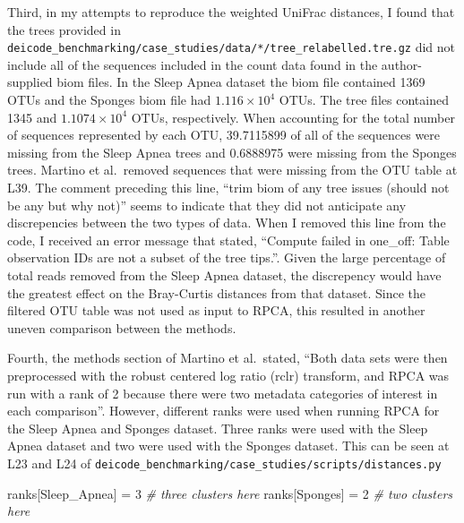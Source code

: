 \documentclass[
]{article}
\newenvironment{Shaded}{}{}
\newcommand{\CommentTok}[1]{\textcolor[rgb]{0.63,0.63,0.65}{\textit{#1}}}
\newcommand{\DecValTok}[1]{\textcolor[rgb]{0.60,0.41,0.00}{#1}}
\newcommand{\NormalTok}[1]{\textcolor[rgb]{0.22,0.23,0.26}{#1}}
\newcommand{\OperatorTok}[1]{\textcolor[rgb]{0.65,0.15,0.64}{#1}}
\newcommand{\StringTok}[1]{\textcolor[rgb]{0.31,0.63,0.31}{#1}}
\begin{document}
Third, in my attempts to reproduce the weighted UniFrac distances, I
found that the trees provided in
\texttt{deicode\_benchmarking/case\_studies/data/*/tree\_relabelled.tre.gz}
did not include all of the sequences included in the count data found in
the author-supplied biom files. In the Sleep Apnea dataset the biom file
contained 1369 OTUs and the Sponges biom file had
\ensuremath{1.116\times 10^{4}} OTUs. The tree files contained 1345 and
\ensuremath{1.1074\times 10^{4}} OTUs, respectively. When accounting for
the total number of sequences represented by each OTU, 39.7115899 of all
of the sequences were missing from the Sleep Apnea trees and 0.6888975
were missing from the Sponges trees. Martino et al.~removed sequences
that were missing from the OTU table at L39. The comment preceding this
line, ``trim biom of any tree issues (should not be any but why not)''
seems to indicate that they did not anticipate any discrepencies between
the two types of data. When I removed this line from the code, I
received an error message that stated, ``Compute failed in one\_off:
Table observation IDs are not a subset of the tree tips.''. Given the
large percentage of total reads removed from the Sleep Apnea dataset,
the discrepency would have the greatest effect on the Bray-Curtis
distances from that dataset. Since the filtered OTU table was not used
as input to RPCA, this resulted in another uneven comparison between the
methods.

Fourth, the methods section of Martino et al.~stated, ``Both data sets
were then preprocessed with the robust centered log ratio (rclr)
transform, and RPCA was run with a rank of 2 because there were two
metadata categories of interest in each comparison''. However, different
ranks were used when running RPCA for the Sleep Apnea and Sponges
dataset. Three ranks were used with the Sleep Apnea dataset and two were
used with the Sponges dataset. This can be seen at L23 and L24 of
\texttt{deicode\_benchmarking/case\_studies/scripts/distances.py}

\footnotesize

\begin{Shaded}
\begin{Highlighting}[numbers=left,,firstnumber=23,]
\NormalTok{ranks[}\StringTok{\textquotesingle{}Sleep\_Apnea\textquotesingle{}}\NormalTok{] }\OperatorTok{=} \DecValTok{3} \CommentTok{\# three clusters here}
\NormalTok{ranks[}\StringTok{\textquotesingle{}Sponges\textquotesingle{}}\NormalTok{] }\OperatorTok{=} \DecValTok{2} \CommentTok{\# two clusters here }
\end{Highlighting}
\end{Shaded}
\end{document}
